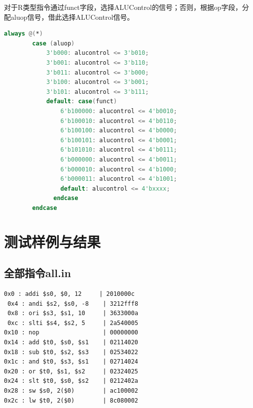 \documentclass[twocolumn]{article} %
\begin{document}
\begin{sloppypar}
对于R类型指令通过funct字段，选择ALUControl的信号；否则，根据op字段，分配aluop信号，借此选择ALUControl信号。
\begin{lstlisting}[language=Verilog]  
always @(*)
        case (aluop)
            3'b000: alucontrol <= 3'b010; 
            3'b001: alucontrol <= 3'b110; 
            3'b011: alucontrol <= 3'b000; 
            3'b100: alucontrol <= 3'b001; 
            3'b101: alucontrol <= 3'b111; 
            default: case(funct)
                6'b100000: alucontrol <= 4'b0010; 
                6'b100010: alucontrol <= 4'b0110; 
                6'b100100: alucontrol <= 4'b0000; 
                6'b100101: alucontrol <= 4'b0001; 
                6'b101010: alucontrol <= 4'b0111; 
                6'b000000: alucontrol <= 4'b0011; 
                6'b000010: alucontrol <= 4'b1000; 
                6'b000011: alucontrol <= 4'b1001; 
                default: alucontrol <= 4'bxxxx; 
              endcase
        endcase
\end{lstlisting}  


\section{测试样例与结果}

\subsection{全部指令all.in}

\begin{lstlisting}[]  
 0x0 : addi $s0, $0, 12     | 2010000c
 0x4 : andi $s2, $s0, -8    | 3212fff8
 0x8 : ori $s3, $s1, 10     | 3633000a
 0xc : slti $s4, $s2, 5     | 2a540005
0x10 : nop                  | 00000000
0x14 : add $t0, $s0, $s1    | 02114020
0x18 : sub $t0, $s2, $s3    | 02534022
0x1c : and $t0, $s3, $s1    | 02714024
0x20 : or $t0, $s1, $s2     | 02324025
0x24 : slt $t0, $s0, $s2    | 0212402a
0x28 : sw $s0, 2($0)        | ac100002
0x2c : lw $t0, 2($0)        | 8c080002
\end{lstlisting}  

\begin{figure}[htbp]
\centering
{}


\end{figure}
\end{sloppypar}
\end{document}
